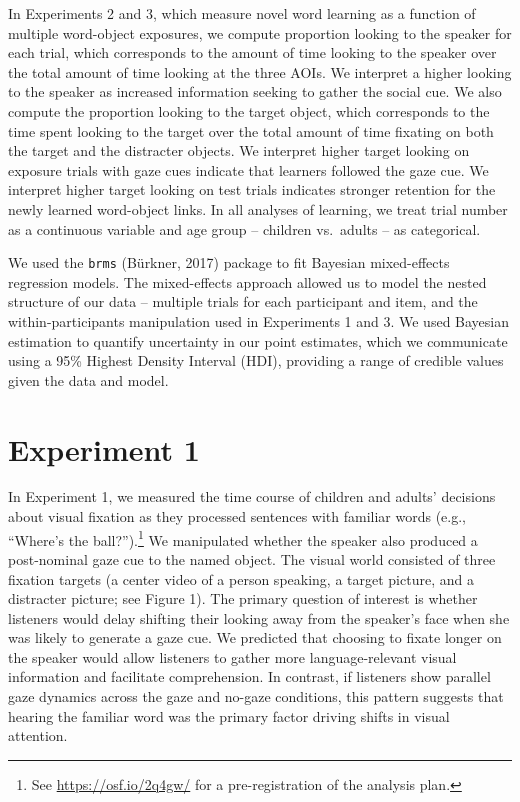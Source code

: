\documentclass[man,floatsintext]{apa6}
\let\rmarkdownfootnote\footnote%
\def\footnote{\protect\rmarkdownfootnote}
\begin{document}
In Experiments 2 and 3, which measure novel word learning as a function
of multiple word-object exposures, we compute proportion looking to the
speaker for each trial, which corresponds to the amount of time looking
to the speaker over the total amount of time looking at the three AOIs.
We interpret a higher looking to the speaker as increased information
seeking to gather the social cue. We also compute the proportion looking
to the target object, which corresponds to the time spent looking to the
target over the total amount of time fixating on both the target and the
distracter objects. We interpret higher target looking on exposure
trials with gaze cues indicate that learners followed the gaze cue. We
interpret higher target looking on test trials indicates stronger
retention for the newly learned word-object links. In all analyses of
learning, we treat trial number as a continuous variable and age group
-- children vs.~adults -- as categorical.

We used the \texttt{brms} (Bürkner, 2017) package to fit Bayesian
mixed-effects regression models. The mixed-effects approach allowed us
to model the nested structure of our data -- multiple trials for each
participant and item, and the within-participants manipulation used in
Experiments 1 and 3. We used Bayesian estimation to quantify uncertainty
in our point estimates, which we communicate using a 95\% Highest
Density Interval (HDI), providing a range of credible values given the
data and model.

\section{Experiment 1}\label{experiment-1}

In Experiment 1, we measured the time course of children and adults'
decisions about visual fixation as they processed sentences with
familiar words (e.g., \enquote{Where's the ball?}).\footnote{See
  \url{https://osf.io/2q4gw/} for a pre-registration of the analysis
  plan.} We manipulated whether the speaker also produced a post-nominal
gaze cue to the named object. The visual world consisted of three
fixation targets (a center video of a person speaking, a target picture,
and a distracter picture; see Figure 1). The primary question of
interest is whether listeners would delay shifting their looking away
from the speaker's face when she was likely to generate a gaze cue. We
predicted that choosing to fixate longer on the speaker would allow
listeners to gather more language-relevant visual information and
facilitate comprehension. In contrast, if listeners show parallel gaze
dynamics across the gaze and no-gaze conditions, this pattern suggests
that hearing the familiar word was the primary factor driving shifts in
visual attention.
\end{document}
